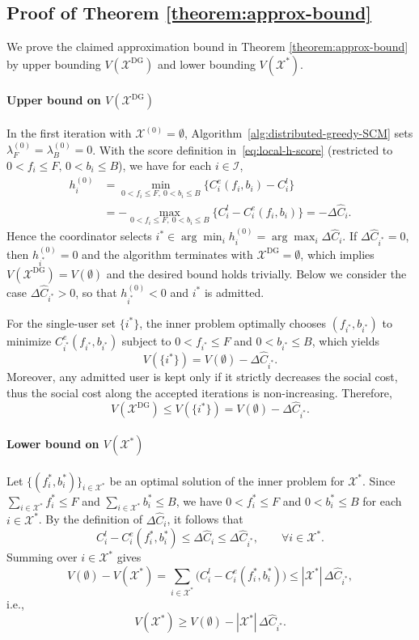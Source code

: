 \documentclass[lettersize,journal]{IEEEtran}
\begin{document}
\subsection{Proof of Theorem \ref{theorem:approx-bound}}\label{proof:greedy-approx-bound}
We prove the claimed approximation bound in Theorem \ref{theorem:approx-bound} by upper bounding $V(\mathcal{X}^{\mathrm{DG}})$ and lower bounding $V(\mathcal{X}^*)$.

\paragraph{Upper bound on $V(\mathcal{X}^{\mathrm{DG}})$}
In the first iteration with $\mathcal{X}^{(0)}=\emptyset$, Algorithm~\ref{alg:distributed-greedy-SCM} sets
$\lambda_F^{(0)}=\lambda_B^{(0)}=0$.
With the score definition in~\eqref{eq:local-h-score} (restricted to $0<f_i\le F,\,0<b_i\le B$),
we have for each $i\in\mathcal{I}$,
\begin{align}
    h_i^{(0)}&=\min_{0<f_i\le F,\ 0<b_i\le B}\{C_i^e(f_i,b_i)-C_i^l\}\nonumber\\
&= -\max_{0<f_i\le F,\ 0<b_i\le B}\{C_i^l-C_i^e(f_i,b_i)\}
= -\Delta \hat{C}_i .
\end{align}
Hence the coordinator selects $i^*\in\arg\min_i h_i^{(0)}=\arg\max_i \Delta\hat{C}_i$.
If $\Delta\hat{C}_{i^*}=0$, then $h_{i^*}^{(0)}=0$ and the algorithm terminates with
$\mathcal{X}^{\mathrm{DG}}=\emptyset$, which implies $V(\mathcal{X}^{\mathrm{DG}})=V(\emptyset)$ and the desired bound holds trivially.
Below we consider the case $\Delta\hat{C}_{i^*}>0$, so that $h_{i^*}^{(0)}<0$ and $i^*$ is admitted.

For the single-user set $\{i^*\}$, the inner problem optimally chooses $(f_{i^*},b_{i^*})$ to minimize $C_{i^*}^e(f_{i^*},b_{i^*})$
subject to $0<f_{i^*}\le F$ and $0<b_{i^*}\le B$, which yields
\[
V(\{i^*\}) = V(\emptyset) - \Delta\hat{C}_{i^*}.
\]
Moreover, any admitted user is kept only if it strictly decreases the social cost, thus the social cost along the accepted iterations is non-increasing. Therefore,
\[
V(\mathcal{X}^{\mathrm{DG}})\le V(\{i^*\}) = V(\emptyset) - \Delta\hat{C}_{i^*}.
\]

\paragraph{Lower bound on $V(\mathcal{X}^*)$}
Let $\{(f_i^*,b_i^*)\}_{i\in\mathcal{X}^*}$ be an optimal solution of the inner problem for $\mathcal{X}^*$.
Since $\sum_{i\in\mathcal{X}^*} f_i^*\le F$ and $\sum_{i\in\mathcal{X}^*} b_i^*\le B$, we have $0<f_i^*\le F$ and $0<b_i^*\le B$
for each $i\in\mathcal{X}^*$.
By the definition of $\Delta\hat{C}_i$, it follows that
\[
C_i^l - C_i^e(f_i^*,b_i^*) \le \Delta\hat{C}_i \le \Delta\hat{C}_{i^*},\qquad \forall i\in\mathcal{X}^*.
\]
Summing over $i\in\mathcal{X}^*$ gives
\[
V(\emptyset)-V(\mathcal{X}^*)
= \sum_{i\in\mathcal{X}^*}\big(C_i^l - C_i^e(f_i^*,b_i^*)\big)
\le |\mathcal{X}^*|\,\Delta\hat{C}_{i^*},
\]
i.e.,
\[
V(\mathcal{X}^*) \ge V(\emptyset) - |\mathcal{X}^*|\,\Delta\hat{C}_{i^*}.
\]
\end{document}
